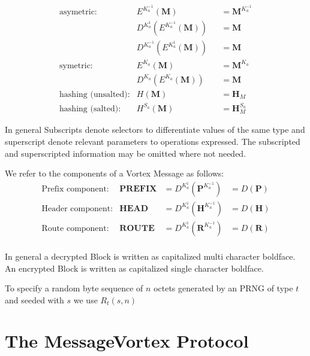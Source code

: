 \documentclass[10pt,journal,compsoc]{IEEEtran}
\begin{document}
\begin{align*}
\text{asymetric:}         & E^{K^{-1}_a}\left(\mathbf{M}\right)                        	&& =\mathbf{M}^{K^{-1}_a}\\
& D^{K^{1}_a}\left(E^{K^{-1}_a}\left(\mathbf{M}\right)\right)	&& =\mathbf{M}\\
& D^{K^{-1}_a}\left(E^{K^{1}_a}\left(\mathbf{M}\right)\right)	&& =\mathbf{M}\\
\text{symetric:}          & E^{K_a}\left(\mathbf{M}\right)                             	&& =\mathbf{M}^{K_a}\\
& D^{K_a}\left(E^{K_a}\left(\mathbf{M}\right)\right)          && =\mathbf{M}\\
\text{hashing (unsalted):}& H\left(\mathbf{M}\right)                                   	&& =\mathbf{H}_M\\
\text{hashing (salted):}  & H^{S_a}\left(\mathbf{M}\right)                             	&& =\mathbf{H}^{S_a}_M
\end{align*}

In general Subscripts denote selectors to differentiate values of the same type and superscript denote relevant parameters to operations expressed. The subscripted and superscripted information may be omitted where not needed.

We refer to the components of a Vortex Message as follows:
\begin{align*}
\text{Prefix component:}         & \mathbf{PREFIX}             	&=D^{K^{1}_a}\left(\mathbf{P}^{K^{-1}_a}\right) &=D\left(\mathbf{P}\right)\\
\text{Header component:}         & \mathbf{HEAD}             	&=D^{K^{1}_a}\left(\mathbf{H}^{K^{-1}_a}\right) &=D\left(\mathbf{H}\right)\\
\text{Route component:}         & \mathbf{ROUTE}             	&=D^{K^{1}_a}\left(\mathbf{R}^{K^{-1}_a}\right) &=D\left(\mathbf{R}\right)\\
\end{align*}

In general a decrypted Block is written as capitalized multi character boldface. An encrypted Block is written as capitalized single character boldface.

To specify a random byte sequence of $n$ octets generated by an PRNG of type $t$ and seeded with $s$ we use $R_t\left(s,n\right)$

\section{The MessageVortex Protocol}
\end{document}
